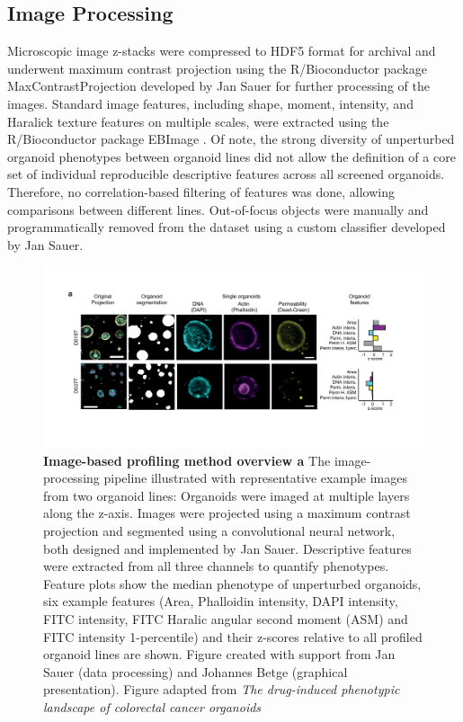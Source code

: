 \begin{flushleft}
\subsection{Image Processing}
Microscopic image z-stacks were compressed to HDF5 format for archival and underwent maximum contrast projection using the R/Bioconductor package MaxContrastProjection developed by Jan Sauer for further processing of the images. Standard image features, including shape, moment, intensity, and Haralick texture features on multiple scales, were extracted using the R/Bioconductor package EBImage \parencite{pauEBImagePackageImage2010}. Of note, the strong diversity of unperturbed organoid phenotypes between organoid lines did not allow the definition of a core set of individual reproducible descriptive features across all screened organoids. Therefore, no correlation-based filtering of features was done, allowing comparisons between different lines. Out-of-focus objects were manually and programmatically removed from the dataset using a custom classifier developed by Jan Sauer.

\begin{figure}[h]
\centering
\includegraphics[width=\textwidth,
                height=\textheight,
                keepaspectratio]{figures/promise/pdf/fig_1_2.pdf}
\caption[Image-based profiling method overview]{\textbf{Image-based profiling method overview a} The image-processing pipeline illustrated with representative example images from two organoid lines: Organoids were imaged at multiple layers along the z-axis. Images were projected using a maximum contrast projection and segmented using a convolutional neural network, both designed and implemented by Jan Sauer. Descriptive features were extracted from all three channels to quantify phenotypes. Feature plots show the median phenotype of unperturbed organoids, six example features (Area, Phalloidin intensity, DAPI intensity, FITC intensity, FITC Haralic angular second moment (ASM) and FITC intensity 1-percentile) and their z-scores relative to all profiled organoid lines are shown. Figure created with support from Jan Sauer (data processing) and Johannes Betge (graphical presentation). Figure adapted from \textit{The drug-induced phenotypic landscape of colorectal cancer organoids} \parencite{betgeDruginducedPhenotypicLandscape2022}}
\label{fig_135}
\end{figure}


\end{flushleft}
